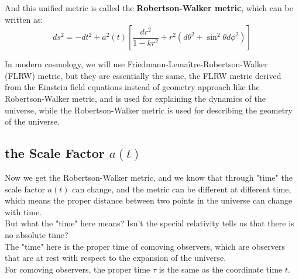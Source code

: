 \newpage
And this unified metric is called the \textbf{Robertson-Walker metric}, which can be written as:
\[
    ds^2 = -dt^2 + a^2(t) \left[ \frac{dr^2}{1 - kr^2} + r^2 (d\theta^2 + \sin^2\theta d\phi^2) \right]
\]

\bigskip\noindent
\begin{remark}
    In modern cosmology, we will use Friedmann-Lemaître-Robertson-Walker (FLRW) metric, but they are essentially the same, the FLRW metric derived from the Einstein field equations instead of geometry approach like the Robertson-Walker metric, and is used for explaining the dynamics of the universe, while the Robertson-Walker metric is used for describing the geometry of the universe.
\end{remark}

\bigskip\noindent
\subsection{the Scale Factor \texorpdfstring{$a(t)$}{a(t)}}
\begin{intuition}
    Now we get the Robertson-Walker metric, and we know that through "time" the scale factor $a(t)$ can change, and the metric can be different at different time, which means the proper distance between two points in the universe can change with time.\\

    But what the "time" here means? Isn't the special relativity tells us that there is no absolute time? \\
    The "time" here is the proper time of comoving observers, which are observers that are at rest with respect to the expansion of the universe. \\
    For comoving observers, the proper time $\tau$ is the same as the coordinate time $t$.
\end{intuition}

